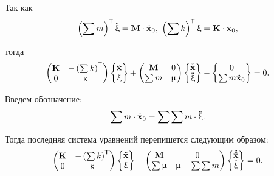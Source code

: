 Так как
\begin{equation}
	\left( \sum m \right) ^ \mathsf{T} \ddot{\upxi} = \mathbf{M} \cdot \ddot{\mathbf{x}}_0, \ \left( \sum k \right) ^ \mathsf{T} \upxi = \mathbf{K} \cdot \mathbf{x}_0,
\end{equation}

тогда
\begin{equation}
	\begin{pmatrix}
		\mathbf{K} & -\left( \sum k \right) ^ \mathsf{T} \\
		0 & \upkappa
	\end{pmatrix}
	\begin{Bmatrix}
		\tilde{\mathbf{x}} \\
		\upxi
	\end{Bmatrix}
	+
	\begin{pmatrix}
	\mathbf{M} & 0 \\
	\sum m & \upmu
	\end{pmatrix}
	\begin{Bmatrix}
		\ddot{\tilde{\mathbf{x}}} \\
		\ddot{\upxi}
	\end{Bmatrix} -
	\begin{Bmatrix}
		0 \\
		\sum m \ddot{\mathbf{x}}_0
	\end{Bmatrix}
	= 0.
\end{equation}

Введем обозначение:
\begin{equation}
	\sum m \cdot \ddot{\mathbf{x}}_0 = \sum \sum m \cdot \ddot{\upxi}.
\end{equation}

Тогда последняя система уравнений перепишется следующим образом:
\begin{equation}
	\begin{pmatrix}
		\mathbf{K} & -\left( \sum k \right) ^ \mathsf{T} \\
		 0 & \upkappa
	\end{pmatrix}
	\begin{Bmatrix}
		\tilde{\mathbf{x}} \\
		\upxi
	\end{Bmatrix}
	+
	\begin{pmatrix}
		\mathbf{M} & 0 \\
		\sum \upmu & \upmu - \sum \sum m
	\end{pmatrix}
		\begin{Bmatrix}
		\ddot{\tilde{\mathbf{x}}} \\
		\ddot{\upxi}
	\end{Bmatrix}
	= 0.
	\label{eq:finalSys}
\end{equation}


